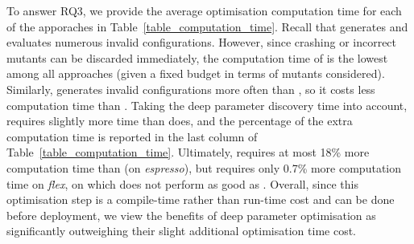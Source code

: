 To answer RQ3, we provide the average optimisation computation time for each of the apporaches in Table~\ref{table_computation_time}. Recall that \dr{} generates and evaluates numerous invalid configurations. However, since crashing or incorrect mutants can be discarded immediately, the computation time of \dr{} is the lowest among all approaches (given a fixed budget in terms of mutants considered). Similarly, \dn{} generates invalid configurations more often than \sn{}, so it costs less computation time than \sn{}. Taking the deep parameter discovery time into account, \dn{} requires slightly more time than \sn{} does, and the percentage of the extra computation time is reported in the last column of Table~\ref{table_computation_time}. Ultimately, \dn{} requires at most 18\% more computation time than \sn{} (on \emph{espresso}), but requires only 0.7\% more computation time on \emph{flex}, on which \dn{} does not perform as good as \sn{}. Overall, since this optimisation step is a compile-time rather than run-time cost and can be done before deployment, we view the benefits of deep parameter optimisation as significantly outweighing their slight additional optimisation time cost.

